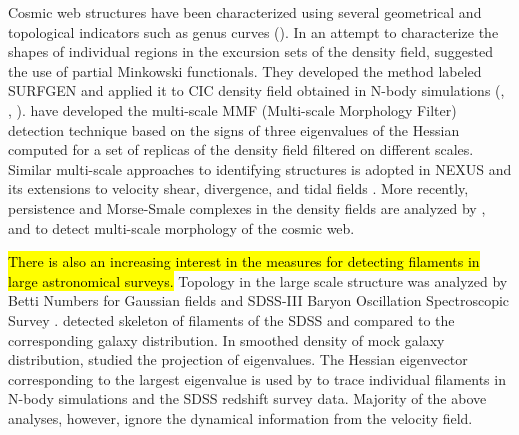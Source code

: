 Cosmic web structures have been characterized using several geometrical and topological indicators such as genus curves (\cite{Gott1986}). In an attempt to characterize the shapes of  individual regions in the excursion sets of the density field, \cite{Sahni1998} suggested the use of partial Minkowski functionals. They developed the method labeled SURFGEN and applied it to CIC density field obtained in N-body simulations 
(\citealt{Sathyaprakash1998}, \citealt{Sheth2003}, \citealt{Shandarin2004}). \cite{Aragon-Calvo2007} have developed the multi-scale MMF (Multi-scale Morphology Filter) detection technique based on the signs of three eigenvalues of the Hessian computed for  a set of replicas of the density field filtered on different scales. Similar multi-scale approaches to identifying structures is adopted in NEXUS and its extensions to velocity shear, divergence, and tidal fields \citep{Cautun2013}. More recently, persistence and Morse-Smale complexes in the density fields are analyzed by \cite{Sousbie2011f}, \cite{Sousbie2011e} and \cite{Shivshankar2015a} to detect multi-scale morphology of the cosmic web.


\hl{There is also an increasing interest in the measures for detecting filaments in large astronomical surveys.} Topology in the large scale structure was analyzed by Betti Numbers for Gaussian fields \citep{Park2013} and SDSS-III Baryon Oscillation Spectroscopic Survey \citep{Parihar2014}. \cite{Sousbie2008c} detected skeleton of filaments of the SDSS and compared to the corresponding galaxy distribution. In smoothed density of mock galaxy distribution, \cite{Bond2010a} studied the projection of eigenvalues. The Hessian eigenvector corresponding to the largest eigenvalue is used by \cite{Bond2010b} to trace individual filaments in N-body simulations and the SDSS redshift survey data. Majority of the above analyses, however, ignore the dynamical information from the velocity field.




